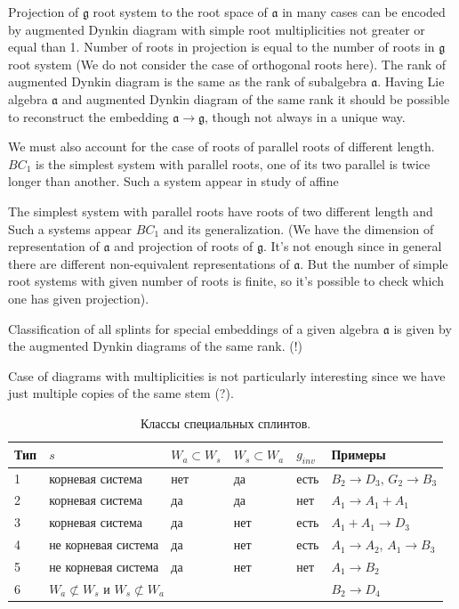 \documentclass{article}
\newcommand{\gf}{\mathfrak{g}}
\newcommand{\af}{\mathfrak{a}}
\begin{document}
Projection of $\gf$ root system to the root space of $\af$ in many cases can be
encoded by augmented Dynkin diagram with simple root multiplicities not greater or equal than 1.
Number of roots in projection is equal to the number of roots in $\gf$ root system (We do
not consider the case of orthogonal roots here). The rank of augmented Dynkin diagram is the same as
the rank of subalgebra $\af$. Having Lie algebra $\af$ and augmented Dynkin
diagram of the same rank it should be possible to reconstruct the embedding $\af\to
\gf$, though not always in a unique way. 

We must also account for the case of roots of parallel roots of different length. $BC_{1} $ is the
simplest system with parallel roots, one of its two parallel is twice longer than another. Such a
system appear in study of affine 


 The simplest
system with parallel roots have roots of two different length and Such a systems
appear  $BC_{1} $ and its generalization. (We have the dimension of representation of $\af$ and
projection of roots of $\gf$. It's not enough since in general there are different non-equivalent
representations of $\af$. But the number of simple root systems with given number of roots is
finite, so it's possible to check which one has given projection).

Classification of all splints for special embeddings of a given algebra $\af$ is given by
the augmented Dynkin diagrams of the same rank. (!)

Case of diagrams with multiplicities is not particularly interesting since we have just multiple
copies of the same stem (?).


\begin{table}[h]
\begin{tabular}[t]{|p{2em}|p{6em}|p{5em}|p{5em}|p{2em}|p{6em}|}
\hline
Тип & $s$ & $W_a\subset W_s$ & $W_s\subset W_a$ & $g_{inv} $ & Примеры \\
\hline
1 & корневая система & нет & да & есть  & $B_2\rightarrow D_3$, $G_2\rightarrow B_3$\\
\hline
2 & корневая система  & да & да & нет & $A_1\rightarrow A_1+A_1$ \\
\hline
3 & корневая система  & да & нет & есть & $A_1+A_1\rightarrow D_3$ \\
\hline
4 & не корневая система  & да & нет & есть & $A_1\rightarrow A_2$, $A_1\rightarrow B_3$\\
\hline
5 & не корневая система  & да & нет & нет  & $A_1\rightarrow B_2$\\
\hline
6 & \multicolumn{4}{|l|}{$W_a\not\subset W_s$ и $W_s\not\subset W_a$} & $B_2\rightarrow D_4$\\
\hline
\end{tabular}
\caption{Классы специальных сплинтов.}
\label {spsp}
\end{table}
\end{document}
